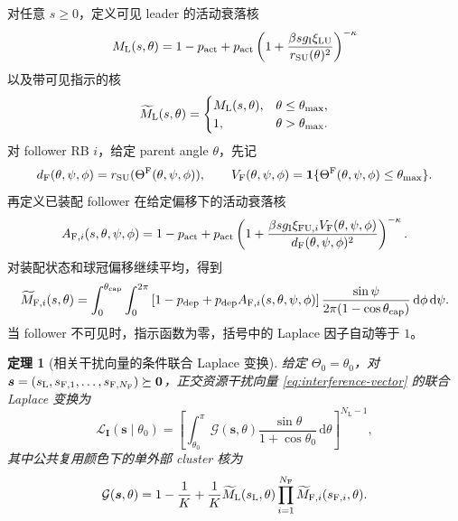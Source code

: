 \documentclass[UTF8,a4paper,11pt]{ctexart}
\newtheorem{theorem}{定理}[section]
\newcommand{\dd}{\,\mathrm d}
\newcommand{\ind}{\mathbf 1}
\newcommand{\NL}{N_{\mathrm L}}
\newcommand{\NF}{N_{\mathrm F}}
\newcommand{\thetam}{\theta_{\max}}
\newcommand{\thetac}{\theta_{\mathrm{cap}}}
\newcommand{\Lcal}{\mathcal L}
\newcommand{\Gcal}{\mathcal G}
\newcommand{\svec}{\bm s}
\newcommand{\Ivec}{\bm I}
\begin{document}
对任意 $s\geq0$，定义可见 leader 的活动衰落核
\begin{equation}
 M_{\rm L}(s,\theta)
 =
 1-p_{\rm act}
 +p_{\rm act}
 \left(
 1+\frac{\beta s g_{\rm I}\xi_{\rm LU}}
 {r_{\rm SU}(\theta)^2}
 \right)^{-\kappa}
 \label{eq:leader-active-kernel}
\end{equation}
以及带可见指示的核
\begin{equation}
 \widetilde M_{\rm L}(s,\theta)
 =
 \begin{cases}
 M_{\rm L}(s,\theta),&\theta\leq\thetam,\\
 1,&\theta>\thetam.
 \end{cases}
 \label{eq:leader-kernel}
\end{equation}
对 follower RB $i$，给定 parent angle $\theta$，先记
\begin{equation}
 d_{\rm F}(\theta,\psi,\phi)
 =r_{\rm SU}(\Theta^{\rm F}(\theta,\psi,\phi)),
 \qquad
 V_{\rm F}(\theta,\psi,\phi)
 =\ind\{\Theta^{\rm F}(\theta,\psi,\phi)\leq\thetam\}.
 \label{eq:follower-shortcuts}
\end{equation}
再定义已装配 follower 在给定偏移下的活动衰落核
\begin{equation}
 A_{{\rm F},i}(s,\theta,\psi,\phi)
 =
 1-p_{\rm act}
 +p_{\rm act}
 \left(
 1+
 \frac{\beta s g_{\rm I}\xi_{{\rm FU},i}
 V_{\rm F}(\theta,\psi,\phi)}
 {d_{\rm F}(\theta,\psi,\phi)^2}
 \right)^{-\kappa}.
 \label{eq:follower-active-kernel}
\end{equation}
对装配状态和球冠偏移继续平均，得到
\begin{equation}
\begin{split}
 \widetilde M_{{\rm F},i}(s,\theta)
 =
 \int_0^{\thetac}\int_0^{2\pi}
 \left[
 1-p_{\rm dep}
 +p_{\rm dep}A_{{\rm F},i}(s,\theta,\psi,\phi)
 \right]
 \frac{\sin\psi}
 {2\pi(1-\cos\thetac)}
 \dd\phi\dd\psi.
\end{split}
\label{eq:follower-kernel}
\end{equation}
当 follower 不可见时，指示函数为零，括号中的 Laplace 因子自动等于 $1$。

\begin{theorem}[相关干扰向量的条件联合 Laplace 变换]
\label{thm:joint-lt}
给定 $\Theta_0=\theta_0$，对
$\svec=(s_{\rm L},s_{{\rm F},1},\ldots,s_{{\rm F},\NF})\succeq\bm0$，正交资源干扰向量
\eqref{eq:interference-vector} 的联合 Laplace 变换为
\begin{equation}
 \Lcal_{\Ivec}(\svec\mid\theta_0)
 =
 \left[
 \int_{\theta_0}^{\pi}
 \Gcal(\svec,\theta)
 \frac{\sin\theta}{1+\cos\theta_0}\dd\theta
 \right]^{\NL-1},
 \label{eq:joint-lt}
\end{equation}
其中公共复用颜色下的单外部 cluster 核为
\begin{equation}
 \Gcal(\svec,\theta)
 =
 1-\frac1K
 +\frac1K
 \widetilde M_{\rm L}(s_{\rm L},\theta)
 \prod_{i=1}^{\NF}
 \widetilde M_{{\rm F},i}(s_{{\rm F},i},\theta).
 \label{eq:joint-cluster-kernel}
\end{equation}
\end{theorem}
\end{document}
